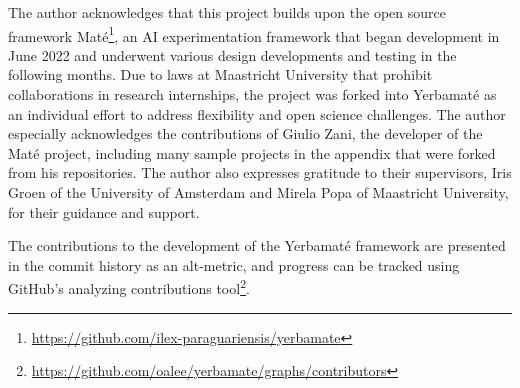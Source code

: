 The author acknowledges that this project builds upon the open source framework Maté\footnote{\url{https://github.com/ilex-paraguariensis/yerbamate}}, an AI experimentation framework that began development in June 2022 and underwent various design developments and testing in the following months. Due to laws at Maastricht University that prohibit collaborations in research internships, the project was forked into Yerbamaté as an individual effort to address flexibility and open science challenges. The author especially acknowledges the contributions of Giulio Zani, the developer of the Maté project, including many sample projects in the appendix that were forked from his repositories. 
The author also expresses gratitude to their supervisors, Iris Groen of the University of Amsterdam and Mirela Popa of Maastricht University, for their guidance and support. 

The contributions to the development of the Yerbamaté framework are presented in the commit history as an alt-metric, and progress can be tracked using GitHub's analyzing contributions tool\footnote{\url{https://github.com/oalee/yerbamate/graphs/contributors}}.



